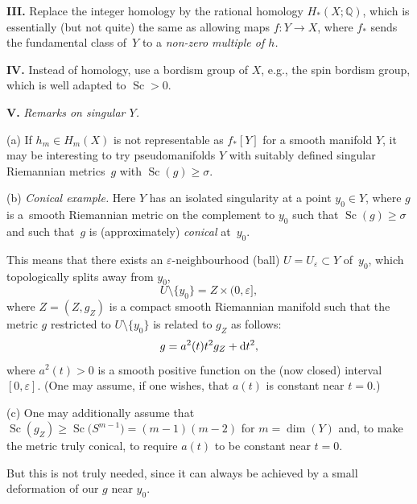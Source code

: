 \documentclass[pdftex]{sigma}
\numberwithin{equation}{section}
\begin{document}
\textbf{III.} Replace the integer homology by the rational homology $H_\ast(X;\mathbb Q)$, which is essentially (but not quite)
the same as allowing maps $f\colon Y\to X$, where
$f_\ast$ sends
 the fundamental class of~$Y$ to a {\it non-zero multiple of $h$.}

\textbf{IV.} Instead of homology, use a bordism group of $X$, e.g., the spin bordism group, which is well adapted to $\operatorname{Sc}>0$.

\textbf{V.} {\it Remarks on singular $Y$.}

(a) If $h_m\in H_m(X)$ is not representable as $f_\ast[Y]$ for a smooth manifold $Y$, it may be interesting to try pseudomanifolds $Y$ with suitably defined singular Riemannian metrics~$g$  with ${\operatorname{Sc}(g)\geq \sigma}$.

(b) {\it Conical example.} Here $Y$ has an isolated singularity at a point $y_0\in Y$, where $g$ is a~smooth Riemannian metric on the complement to $y_0$ such that $\operatorname{Sc}(g)\geq \sigma$ and such that~$g $ is (approximately) {\it conical} at~$y_0$.

This means that there exists an $\varepsilon$-neighbourhood (ball) $U=U_\varepsilon\subset Y$ of~$y_0$, which topologically splits away from $y_0$,
\[
U\setminus \{y_0\}=Z\times (0,\varepsilon],
\]
 where $Z=(Z,g_Z)$ is a compact smooth Riemannian manifold such that the metric $g$ restricted to
 $U\setminus \{y_0\}$ is related to $g_Z$ as follows:
\[
g= a^2(t)t^2g_Z +{\rm d}t^2,
\]
where $a^2(t)>0$ is a smooth positive function on the (now closed) interval $[0, \varepsilon]$. (One may assume, if one wishes, that $a(t)$ is constant near $ t=0$.)

(c) One may additionally assume that $\operatorname{Sc}(g_Z)\geq \operatorname{Sc}\bigl(S^{m-1}\bigr)=(m-1)(m-2)$ for $m=\dim(Y)$ and, to make the metric truly conical, to require $a(t)$ to be constant near $ t=0$.

But this is not truly needed, since it can always be achieved by a small deformation of our $g$ near $y_0$.
\end{document}

